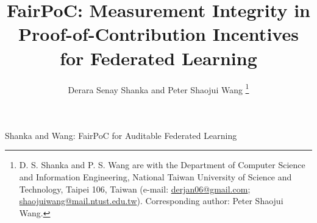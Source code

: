\documentclass[journal]{IEEEtran}
\theoremstyle{definition}
\theoremstyle{remark}
\begin{document}
\title{FairPoC: Measurement Integrity in Proof-of-Contribution
Incentives for Federated Learning}

\author{Derara Senay Shanka and Peter Shaojui Wang%
\thanks{D. S. Shanka and P. S. Wang are with the Department of Computer
Science and Information Engineering, National Taiwan University of Science
and Technology, Taipei 106, Taiwan (e-mail:
\href{mailto:derjan06@gmail.com}{derjan06@gmail.com};
\href{mailto:shaojuiwang@mail.ntust.edu.tw}{shaojuiwang@mail.ntust.edu.tw}).
Corresponding author: Peter Shaojui Wang.}%
}

%
{Shanka and Wang: FairPoC for Auditable Federated Learning}

\maketitle
\end{document}
